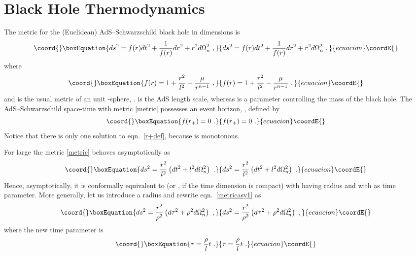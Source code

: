 \documentclass[a4paper,12pt]{article}
\begin{document}
\section{Black Hole Thermodynamics}
\label{entropy}
The metric for the (Euclidean) AdS--Schwarzschild black hole in
\coordHE{} dimensions is
\begin{equation}\coord{}\boxEquation{
\label{metric}
  ds^2 = f(r) dt^2 + \frac1{f(r)} dr^2 +r^2 d\Omega_n^2~,
}{
ds^2 = f(r) dt^2 + \frac1{f(r)} dr^2 +r^2 d\Omega_n^2~,
}{ecuacion}\coordE{}\end{equation}
where
\begin{equation}\coord{}\boxEquation{
\label{fdef}
  f(r) = 1+\frac{r^2}{l^2} -\frac{\mu}{r^{n-1}}~,
}{
f(r) = 1+\frac{r^2}{l^2} -\frac{\mu}{r^{n-1}}~,
}{ecuacion}\coordE{}\end{equation}
and \coordHE{} is the usual metric of an unit \coordHE{}-sphere, \coordHE{}.
\coordHE{} is the AdS length scale, whereas \myHighlight{$\mu$}\coordHE{} is a parameter
controlling the mass of the black hole. The AdS--Schwarzschild
space-time with metric \eqref{metric} possesses an event horizon,
\coordHE{}, defined by
\begin{equation}\coord{}\boxEquation{
\label{r+def}
  f(r_+)=0~.
}{
f(r_+)=0~.
}{ecuacion}\coordE{}\end{equation}
Notice that there is only one solution to eqn.\ \eqref{r+def}, because
\coordHE{} is monotonous.

For large \coordHE{} the metric \eqref{metric} behaves asymptotically as
\begin{equation}\coord{}\boxEquation{
\label{metricasy1}
  ds^2 = \frac{r^2}{l^2} \left( dt^2 + l^2 d\Omega_n^2 \right)~.
}{
ds^2 = \frac{r^2}{l^2} \left( dt^2 + l^2 d\Omega_n^2 \right)~.
}{ecuacion}\coordE{}\end{equation}
Hence, asymptotically, it is conformally equivalent to \coordHE{} (or \coordHE{}, if the time dimension is compact)
with \coordHE{} having radius \coordHE{} and with \coordHE{} as time parameter. More generally,
let us introduce a radius \myHighlight{$\rho$}\coordHE{} and rewrite eqn.\
\eqref{metricasy1} as
\begin{equation}\coord{}\boxEquation{
\label{metricasy2}
  ds^2 = \frac{r^2}{\rho^2} \left( d\tau^2 + \rho^2 d\Omega_n^2
  \right)~,
}{
ds^2 = \frac{r^2}{\rho^2} \left( d\tau^2 + \rho^2 d\Omega_n^2
  \right)~,
}{ecuacion}\coordE{}\end{equation}
where the new time parameter is
\begin{equation}\coord{}\boxEquation{
\label{taudef}
  \tau = \frac{\rho}l t~.
}{
\tau = \frac{\rho}l t~.
}{ecuacion}\coordE{}\end{equation}
\end{document}
